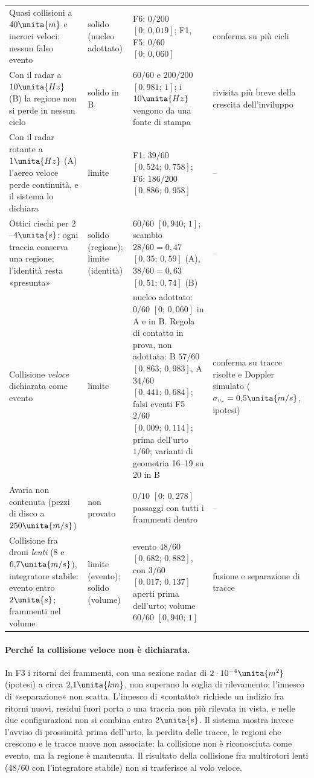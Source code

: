 \begin{table}[H]
\begin{tabularx}{\linewidth}{@{}>{\RaggedRight\arraybackslash}p{5.0cm}>{\RaggedRight\arraybackslash}p{2.1cm}>{\RaggedRight\arraybackslash}p{4.4cm}L@{}}
Quasi collisioni a $40\unita{m}$ e incroci veloci: nessun falso evento & solido (nucleo adottato) & F6: $0/200$ $[0;\,0{,}019]$; F1, F5: $0/60$ $[0;\,0{,}060]$ & conferma su più cicli\\
Con il radar a $10\unita{Hz}$ (B) la regione non si perde in nessun ciclo & solido in B & $60/60$ e $200/200$ $[0{,}981;\,1]$; i $10\unita{Hz}$ vengono da una fonte di stampa & rivisita più breve della crescita dell'inviluppo\\
Con il radar rotante a $1\unita{Hz}$ (A) l'aereo veloce perde continuità, e il sistema lo dichiara & limite & F1: $39/60$ $[0{,}524;\,0{,}758]$; F6: $186/200$ $[0{,}886;\,0{,}958]$ & --\\
Ottici ciechi per $2$--$4\unita{s}$: ogni traccia conserva una regione; l'identità resta «presunta» & solido (regione); limite (identità) & $60/60$ $[0{,}940;\,1]$; scambio $28/60=0{,}47$ $[0{,}35;\,0{,}59]$ (A), $38/60=0{,}63$ $[0{,}51;\,0{,}74]$ (B) & --\\
Collisione \emph{veloce} dichiarata come evento & limite & nucleo adottato: $0/60$ $[0;\,0{,}060]$ in A e in B. Regola di contatto in prova, non adottata: B $57/60$ $[0{,}863;\,0{,}983]$, A $34/60$ $[0{,}441;\,0{,}684]$; falsi eventi F5 $2/60$ $[0{,}009;\,0{,}114]$; prima dell'urto $1/60$; varianti di geometria 16--19 su 20 in B & conferma su tracce risolte e Doppler simulato ($\sigma_{v_r}=0{,}5\unita{m/s}$, ipotesi)\\
Avaria non contenuta (pezzi di disco a $250\unita{m/s}$) & non provato & $0/10$ $[0;\,0{,}278]$ passaggi con tutti i frammenti dentro & --\\
Collisione fra droni \emph{lenti} ($8$ e $6{,}7\unita{m/s}$), integratore stabile: evento entro $2\unita{s}$; frammenti nel volume & limite (evento); solido (volume) & evento $48/60$ $[0{,}682;\,0{,}882]$, con $3/60$ $[0{,}017;\,0{,}137]$ aperti prima dell'urto; volume $60/60$ $[0{,}940;\,1]$ & fusione e separazione di tracce\\
\bottomrule
\end{tabularx}
\end{table}

\paragraph{Perché la collisione veloce non è dichiarata.} In F3 i ritorni dei frammenti, con una sezione radar di $2\cdot10^{-4}\unita{m^2}$ (ipotesi) a circa $2{,}1\unita{km}$, non superano la soglia di rilevamento; l'innesco di «separazione» non scatta. L'innesco di «contatto» richiede un indizio fra ritorni nuovi, residui fuori porta o una traccia non più rilevata in vista, e nelle due configurazioni non si combina entro $2\unita{s}$. Il sistema mostra invece l'avviso di prossimità prima dell'urto, la perdita delle tracce, le regioni che crescono e le tracce nuove non associate: la collisione non è riconosciuta come evento, ma la regione è mantenuta. Il risultato della collisione fra multirotori lenti ($48/60$ con l'integratore stabile) non si trasferisce al volo veloce.

